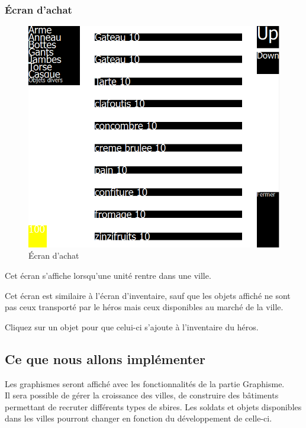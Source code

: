 \documentclass[11pt,a4paper]{article}
\begin{document}
\subsubsection{Écran d'achat}

\begin{figure}[h]
\begin{center}
\includegraphics[scale=0.6]{./ecranAchat.png}
\caption{Écran d'achat}
\end{center}
\end{figure}

Cet écran s'affiche lorsqu'une unité rentre dans une ville.

Cet écran est similaire à l'écran d'inventaire, sauf que les objets affiché ne sont pas ceux transporté par le héros mais ceux disponibles au marché de la ville.

Cliquez sur un objet pour que celui-ci s'ajoute à l'inventaire du héros.

\subsection{Ce que nous allons implémenter}

Les graphismes seront affiché avec les fonctionnalités de la partie Graphisme. \\
Il sera possible de gérer la croissance des villes, de construire des bâtiments permettant de recruter différents types de sbires. Les soldats et objets disponibles dans les villes pourront changer en fonction du développement de celle-ci.
\end{document}
